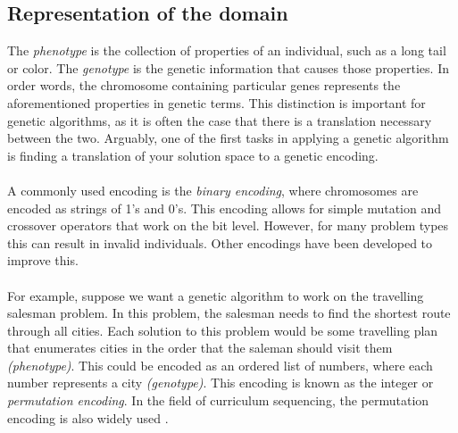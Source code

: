 \subsection{Representation of the domain}
The \emph{phenotype} is the collection of properties of an individual, such as
a long tail or color. The \emph{genotype} is the genetic information that
causes those properties. In order words, the chromosome containing particular
genes represents the aforementioned properties in genetic terms. This
distinction is important for genetic algorithms, as it is often the case that
there is a translation necessary between the two. Arguably, one of the first
tasks in applying a genetic algorithm is finding a translation of your
solution space to a genetic encoding.\\\\
\noindent
A commonly used encoding is the \emph{binary encoding}, where chromosomes are encoded as
strings of 1's and 0's. This encoding allows for simple mutation and crossover
operators that work on the bit level. However, for many problem types this can
result in invalid individuals. Other encodings have been developed to improve
this.\\\\
\noindent
For example, suppose we want a genetic algorithm to work on the travelling
salesman problem. In this problem, the salesman needs to find the shortest
route through all cities. Each solution to this problem would be some
travelling plan that enumerates cities in the order that the saleman should
visit them \textit{(phenotype)}. This could be encoded as an ordered list of
numbers, where each number represents a city \textit{(genotype)}. This encoding
is known as the integer or \emph{permutation encoding}. In the field of
curriculum sequencing, the permutation encoding is also widely used
\citep{AlMuhaideb2011}.
